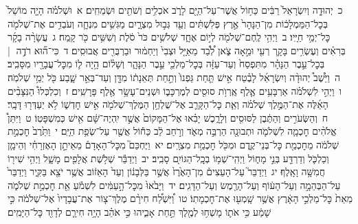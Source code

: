 \documentclass[18pt]{article}
\begin{document}
 {\loc כ~}יְהוּדָ֤ה וְיִשְׂרָאֵל֙ רַבִּ֔ים כַּח֥וֹל אֲשֶׁר־עַל־הַיָּ֖ם לָרֹ֑ב אֹכְלִ֥ים וְשֹׁתִ֖ים וּשְׂמֵחִֽים׃ 
\startlock
 {\loc א~}וּשְׁלֹמֹ֗ה הָיָ֤ה מוֹשֵׁל֙ בְּכׇל־הַמַּמְלָכ֔וֹת מִן־הַנָּהָר֙ אֶ֣רֶץ פְּלִשְׁתִּ֔ים וְעַ֖ד גְּב֣וּל מִצְרָ֑יִם מַגִּשִׁ֥ים מִנְחָ֛ה וְעֹבְדִ֥ים אֶת־שְׁלֹמֹ֖ה כׇּל־יְמֵ֥י חַיָּֽיו׃ \startlock
 {\loc ב~}וַיְהִ֥י לֶֽחֶם־שְׁלֹמֹ֖ה לְי֣וֹם אֶחָ֑ד שְׁלֹשִׁ֥ים כֹּר֙ סֹ֔לֶת וְשִׁשִּׁ֥ים כֹּ֖ר קָֽמַח׃ \startlock
 {\loc ג~}עֲשָׂרָ֨ה בָקָ֜ר בְּרִאִ֗ים וְעֶשְׂרִ֥ים בָּקָ֛ר רְעִ֖י וּמֵ֣אָה צֹ֑אן לְ֠בַ֠ד מֵאַיָּ֤ל וּצְבִי֙ וְיַחְמ֔וּר וּבַרְבֻּרִ֖ים אֲבוּסִֽים׃ \startlock
 {\loc ד~}כִּי־ה֞וּא רֹדֶ֣ה  |  בְּכׇל־עֵ֣בֶר הַנָּהָ֗ר מִתִּפְסַח֙ וְעַד־עַזָּ֔ה בְּכׇל־מַלְכֵ֖י עֵ֣בֶר הַנָּהָ֑ר וְשָׁל֗וֹם הָ֥יָה ל֛וֹ מִכׇּל־עֲבָרָ֖יו מִסָּבִֽיב׃ \startlock
 {\loc ה~}וַיֵּ֩שֶׁב֩ יְהוּדָ֨ה וְיִשְׂרָאֵ֜ל לָבֶ֗טַח אִ֣ישׁ תַּ֤חַת גַּפְנוֹ֙ וְתַ֣חַת תְּאֵנָת֔וֹ מִדָּ֖ן וְעַד־בְּאֵ֣ר שָׁ֑בַע כֹּ֖ל יְמֵ֥י שְׁלֹמֹֽה׃ \startlock
 {\loc ו~}וַיְהִ֣י לִשְׁלֹמֹ֗ה אַרְבָּעִ֥ים אֶ֛לֶף אֻֽרְוֺ֥ת סוּסִ֖ים לְמֶרְכָּב֑וֹ וּשְׁנֵים־עָשָׂ֥ר אֶ֖לֶף פָּרָשִֽׁים׃ \startlock
 {\loc ז~}וְכִלְכְּלוּ֩ הַנִּצָּבִ֨ים הָאֵ֜לֶּה אֶת־הַמֶּ֣לֶךְ שְׁלֹמֹ֗ה וְאֵ֧ת כׇּל־הַקָּרֵ֛ב אֶל־שֻׁלְחַ֥ן הַמֶּלֶךְ־שְׁלֹמֹ֖ה אִ֣ישׁ חׇדְשׁ֑וֹ לֹ֥א יְעַדְּר֖וּ דָּבָֽר׃ \startlock
 {\loc ח~}וְהַשְּׂעֹרִ֣ים וְהַתֶּ֔בֶן לַסּוּסִ֖ים וְלָרָ֑כֶשׁ יָבִ֗אוּ אֶל־הַמָּקוֹם֙ אֲשֶׁ֣ר יִֽהְיֶה־שָּׁ֔ם אִ֖ישׁ כְּמִשְׁפָּטֽוֹ׃ \startlock
 {\loc ט~}וַיִּתֵּן֩ אֱלֹהִ֨ים חׇכְמָ֧ה לִשְׁלֹמֹ֛ה וּתְבוּנָ֖ה הַרְבֵּ֣ה מְאֹ֑ד וְרֹ֣חַב לֵ֔ב כַּח֕וֹל אֲשֶׁ֖ר עַל־שְׂפַ֥ת הַיָּֽם׃ \startlock
 {\loc י~}וַתֵּ֙רֶב֙ חׇכְמַ֣ת שְׁלֹמֹ֔ה מֵחׇכְמַ֖ת כׇּל־בְּנֵי־קֶ֑דֶם וּמִכֹּ֖ל חׇכְמַ֥ת מִצְרָֽיִם׃ \startlock
 {\loc יא~}וַיֶּחְכַּם֮ מִכׇּל־הָאָדָם֒ מֵאֵיתָ֣ן הָאֶזְרָחִ֗י וְהֵימָ֧ן וְכַלְכֹּ֛ל וְדַרְדַּ֖ע בְּנֵ֣י מָח֑וֹל וַיְהִֽי־שְׁמ֥וֹ בְכׇֽל־הַגּוֹיִ֖ם סָבִֽיב׃ \startlock
 {\loc יב~}וַיְדַבֵּ֕ר שְׁלֹ֥שֶׁת אֲלָפִ֖ים מָשָׁ֑ל וַיְהִ֥י שִׁיר֖וֹ חֲמִשָּׁ֥ה וָאָֽלֶף׃ \startlock
 {\loc יג~}וַיְדַבֵּר֮ עַל־הָעֵצִים֒ מִן־הָאֶ֙רֶז֙ אֲשֶׁ֣ר בַּלְּבָנ֔וֹן וְעַד֙ הָאֵז֔וֹב אֲשֶׁ֥ר יֹצֵ֖א בַּקִּ֑יר וַיְדַבֵּר֙ עַל־הַבְּהֵמָ֣ה וְעַל־הָע֔וֹף וְעַל־הָרֶ֖מֶשׂ וְעַל־הַדָּגִֽים׃ \startlock
 {\loc יד~}וַיָּבֹ֙אוּ֙ מִכׇּל־הָ֣עַמִּ֔ים לִשְׁמֹ֕עַ אֵ֖ת חׇכְמַ֣ת שְׁלֹמֹ֑ה מֵאֵת֙ כׇּל־מַלְכֵ֣י הָאָ֔רֶץ אֲשֶׁ֥ר שָֽׁמְע֖וּ אֶת־חׇכְמָתֽוֹ׃ \startlock
 {\loc טו~}וַ֠יִּשְׁלַ֠ח חִירָ֨ם מֶלֶךְ־צ֤וֹר אֶת־עֲבָדָיו֙ אֶל־שְׁלֹמֹ֔ה כִּ֣י שָׁמַ֔ע כִּ֥י אֹת֛וֹ מָשְׁח֥וּ לְמֶ֖לֶךְ תַּ֣חַת אָבִ֑יהוּ כִּ֣י אֹהֵ֗ב הָיָ֥ה חִירָ֛ם לְדָוִ֖ד כׇּל־הַיָּמִֽים׃ \startlock
\end{document}
